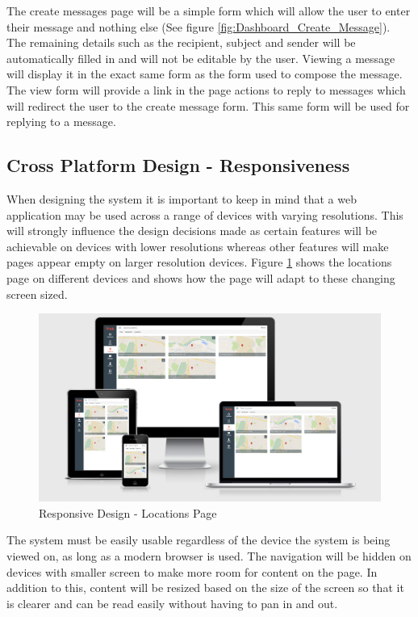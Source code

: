 The create messages page will be a simple form which will allow the user to enter their message and nothing else (See figure \ref{fig:Dashboard_Create_Message}). The remaining details such as the recipient, subject and sender will be automatically filled in and will not be editable by the user. Viewing a message will display it in the exact same form as the form used to compose the message. The view form will provide a link in the page actions to reply to messages which will redirect the user to the create message form. This same form will be used for replying to a message. 

\subsection{Cross Platform Design - Responsiveness}
When designing the system it is important to keep in mind that a web application may be used across a range of devices with varying resolutions. This will strongly influence the design decisions made as certain features will be achievable on devices with lower resolutions whereas other features will make pages appear empty on larger resolution devices. Figure \ref{fig:Dashboard_Responsive} shows the locations page on different devices and shows how the page will adapt to these changing screen sized.

\begin{figure}[H]
	\centering
	\includegraphics[width=1.0\textwidth]{images/Frisk/Responsive}
	\caption{Responsive Design - Locations Page } \label{fig:Dashboard_Responsive}
\end{figure}

The system must be easily usable regardless of the device the system is being viewed on, as long as a modern browser is used. The navigation will be hidden on devices with smaller screen to make more room for content on the page. In addition to this, content will be resized based on the size of the screen so that it is clearer and can be read easily without having to pan in and out.
\newpage